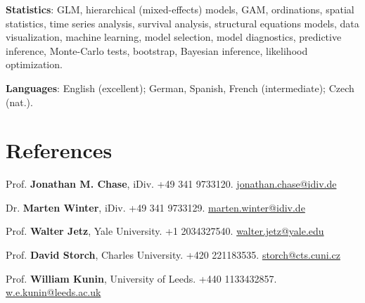 \medskip

{\bf Statistics}: GLM, hierarchical (mixed-effects) models, GAM, ordinations, spatial statistics, time series analysis, survival analysis, structural equations models, data visualization, machine learning, model selection, model diagnostics, predictive inference, Monte-Carlo tests, bootstrap, Bayesian inference, likelihood optimization.

\medskip

{\bf Languages}: English (excellent); German, Spanish, French (intermediate); Czech (nat.).

\HRule

\section{References}


Prof. \textbf{Jonathan M. Chase}, iDiv. \phone +49 341 9733120. \href{mailto: jonathan.chase@idiv.de}{jonathan.chase@idiv.de}

\medskip

Dr. \textbf{Marten Winter}, iDiv. \phone +49 341 9733129. \href{mailto: marten.winter@idiv.de}{marten.winter@idiv.de}

\medskip

Prof. \textbf{Walter Jetz}, Yale University. \phone +1 2034327540. \href{mailto:walter.jetz@yale.edu}{walter.jetz@yale.edu}

\medskip

Prof. \textbf{David Storch}, Charles University. \phone +420 221183535. 
\href{mailto:storch@cts.cuni.cz}{storch@cts.cuni.cz}

\medskip

Prof. \textbf{William Kunin}, University of Leeds. \phone +440 1133432857. \href{mailto:w.e.kunin@leeds.ac.uk}{w.e.kunin@leeds.ac.uk}






\grid
\grid
